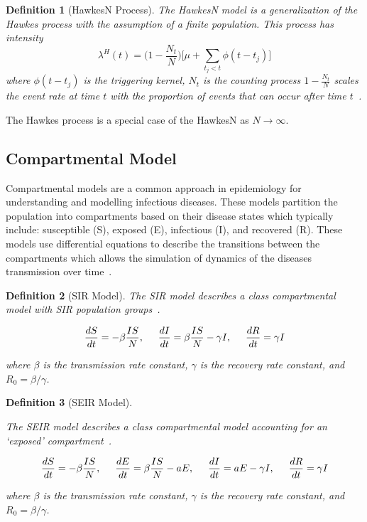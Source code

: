 \documentclass[12pt]{article}
\newtheorem{definition}{Definition}
\begin{document}
\begin{definition}[HawkesN Process] 
The HawkesN model is a generalization of the Hawkes process with the assumption of a finite population. This process has intensity
\[
\lambda^H(t) = \Big ( 1 - \frac{N_t}{N} \Big ) \Big [ \mu + \sum_{t_j < t} \phi (t - t_j) \Big ]
\]  
where $\phi( t - t_j)$ is the triggering kernel, $N_t$ is the counting process $ 1 - \frac{N_t}{N}$ scales the event rate at time $t$ with the proportion of events that can occur after time $t$~\cite{Rizoiu2018}. 
  
\end{definition}


The Hawkes process is a special case of the HawkesN as $N \to \infty$. 


\subsection{Compartmental Model}

Compartmental models are a common approach in epidemiology for understanding and modelling infectious diseases. These models partition the population into compartments based on their disease states which typically include: susceptible (S), exposed (E), infectious (I), and recovered (R). These models use differential equations to describe the transitions between the compartments which allows the simulation of dynamics of the diseases transmission over time~\cite{Bertozzi2020}. 
\\

\begin{definition}[SIR Model]
The SIR model describes a class compartmental model with SIR population groups~\cite{Bertozzi2020}. 
 
\[
\frac{dS}{dt} = - \beta \frac{IS}{N}, \hspace{5mm}
\frac{dI}{dt} = \beta \frac{IS}{N} - \gamma I, \hspace{5mm}
\frac{dR}{dt} = \gamma I 
\]

where $\beta$ is the transmission rate constant, $\gamma$ is the recovery rate constant, and $R_0 = \beta/\gamma$. 
\end{definition}
\vspace{3mm}



\begin{definition}[SEIR Model]\label{SEIR}

The SEIR model describes a class compartmental model accounting for an `exposed' compartment~\cite{Bertozzi2020}. 

\[
\frac{dS}{dt} = - \beta \frac{IS}{N}, \hspace{5mm}
\frac{dE}{dt} = \beta \frac{IS}{N} - a E, \hspace{5mm}
\frac{dI}{dt} = aE - \gamma I, \hspace{5mm}
\frac{dR}{dt} = \gamma I 
\]

where $\beta$ is the transmission rate constant, $\gamma$ is the recovery rate constant, and $R_0 = \beta/\gamma$. 
\end{definition}
\end{document}
